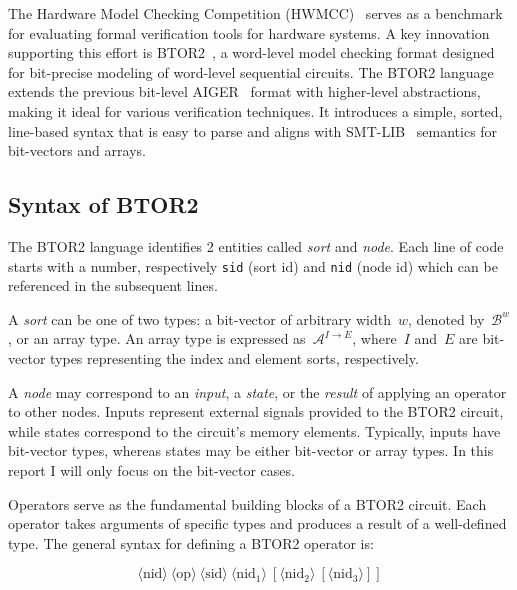 
The Hardware Model Checking Competition (HWMCC)~\cite{hwmcc} serves as a benchmark for evaluating formal verification tools for hardware systems. A key innovation supporting this effort is BTOR2~\cite{btor2}, a word-level model checking format designed for bit-precise modeling of word-level sequential circuits.
The BTOR2 language extends the previous bit-level AIGER~\cite{AIGER} format with higher-level abstractions, making it ideal for various verification techniques. It introduces a simple, sorted, line-based syntax that is easy to parse and aligns with SMT-LIB~\cite{SMT-LIB} semantics for bit-vectors and arrays.

\subsection{Syntax of BTOR2}

The BTOR2 language identifies 2 entities called \textit{sort} and \textit{node}. Each line of code starts with a number, respectively \verb|sid| (sort id) and \verb|nid| (node id) which can be referenced in the subsequent lines.  

A \emph{sort} can be one of two types: a bit-vector of arbitrary width~$w$, denoted by~$\mathcal{B}^w$, or an array type. An array type is expressed as~$\mathcal{A}^{I \to E}$, where~$I$ and~$E$ are bit-vector types representing the index and element sorts, respectively.

A \emph{node} may correspond to an \emph{input}, a \emph{state}, or the \emph{result} of applying an operator to other nodes. Inputs represent external signals provided to the BTOR2 circuit, while states correspond to the circuit's memory elements. Typically, inputs have bit-vector types, whereas states may be either bit-vector or array types. In this report I will only focus on the bit-vector cases.

Operators serve as the fundamental building blocks of a BTOR2 circuit. Each operator takes arguments of specific types and produces a result of a well-defined type. The general syntax for defining a BTOR2 operator is:

\[
\langle \text{nid} \rangle\ \langle \text{op} \rangle\ \langle \text{sid} \rangle\ \langle \text{nid}_1 \rangle\ [\langle \text{nid}_2 \rangle\ [\langle \text{nid}_3 \rangle]]
\]

